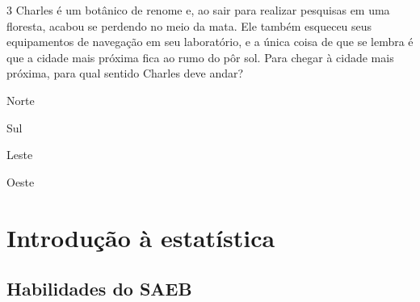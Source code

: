 





\num{3} Charles é um botânico de renome e, ao sair para realizar pesquisas em
uma floresta, acabou se perdendo no meio da mata. Ele também esqueceu
seus equipamentos de navegação em seu laboratório, e a única coisa de
que se lembra é que a cidade mais próxima fica ao rumo do pôr sol. Para
chegar à cidade mais próxima, para qual sentido Charles deve andar?

\begin{escolha}[itemsep=0pt]
\item Norte
\item Sul
\item Leste
\item Oeste 
\end{escolha}







\chapter{Introdução à estatística}

\section{Habilidades do SAEB}

